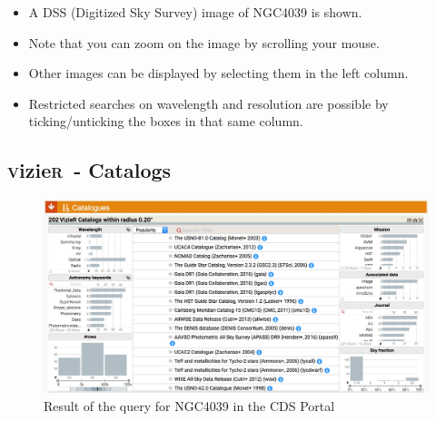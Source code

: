 \documentclass [a4paper, 12pt]{article}
\newcommand{\vizier}{{\textsc{v}izie\textsc{r}}}
\begin{document}
\begin{itemize}
\item A DSS (Digitized Sky Survey) image of NGC4039 is shown.
\item Note that you can zoom on the image by scrolling your mouse. 
\item Other images can be displayed by selecting them in the left 
column. 
\item Restricted searches on wavelength and resolution are possible by 
ticking/unticking the boxes in that same column.
\end{itemize}


\subsection{\vizier\ - Catalogs}


\begin{figure}[H]
\center
\includegraphics[width=1  
\textwidth]{../images/cdsportal_catalogue-information_ngc4039.jpg}
\caption{Result of the query for NGC4039 in the CDS Portal}
\label{fig:cdsportal4}
\end{figure}
\end{document}
